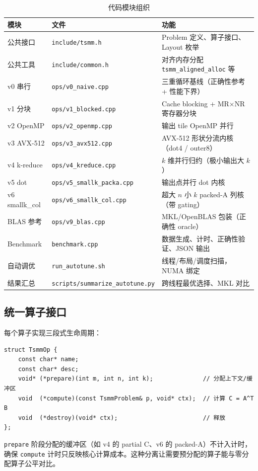 \documentclass[11pt,a4paper,fontset=fandol]{ctexart}
\begin{document}
\begin{table}[H]
\centering
\caption{代码模块组织}
\small
\begin{tabular}{lll}
\toprule
模块 & 文件 & 功能 \\
\midrule
公共接口 & \texttt{include/tsmm.h} & Problem 定义、算子接口、Layout 枚举 \\
公共工具 & \texttt{include/common.h} & 对齐内存分配 \texttt{tsmm\_aligned\_alloc} 等 \\
v0 串行 & \texttt{ops/v0\_naive.cpp} & 三重循环基线（正确性参考 + 性能下界） \\
v1 分块 & \texttt{ops/v1\_blocked.cpp} & Cache blocking + MR$\times$NR 寄存器分块 \\
v2 OpenMP & \texttt{ops/v2\_openmp.cpp} & 输出 tile OpenMP 并行 \\
v3 AVX-512 & \texttt{ops/v3\_avx512.cpp} & AVX-512 形状分流内核（dot4 / outer8） \\
v4 k-reduce & \texttt{ops/v4\_kreduce.cpp} & $k$ 维并行归约（极小输出大 $k$） \\
v5 dot & \texttt{ops/v5\_smallk\_packa.cpp} & 输出点并行 dot 内核 \\
v6 smallk\_col & \texttt{ops/v6\_smallk\_col.cpp} & 超大 $n$ 小 $k$ packed-A 列核（带 gating） \\
BLAS 参考 & \texttt{ops/v9\_blas.cpp} & MKL/OpenBLAS 包装（正确性 oracle） \\
Benchmark & \texttt{benchmark.cpp} & 数据生成、计时、正确性验证、JSON 输出 \\
自动调优 & \texttt{run\_autotune.sh} & 线程/布局/调度扫描，NUMA 绑定 \\
结果汇总 & \texttt{scripts/summarize\_autotune.py} & 跨线程最优选择、MKL 对比 \\
\bottomrule
\end{tabular}
\end{table}

\subsection{统一算子接口}
每个算子实现三段式生命周期：
\begin{lstlisting}
struct TsmmOp {
    const char* name;
    const char* desc;
    void* (*prepare)(int m, int n, int k);              // 分配上下文/缓冲区
    void  (*compute)(const TsmmProblem& p, void* ctx);  // 计算 C = A^T B
    void  (*destroy)(void* ctx);                        // 释放
};
\end{lstlisting}
\texttt{prepare} 阶段分配的缓冲区（如 v4 的 partial C、v6 的 packed-A）不计入计时，确保 \texttt{compute} 计时只反映核心计算成本。这种分离让需要预分配的算子能与零分配算子公平对比。
\end{document}
